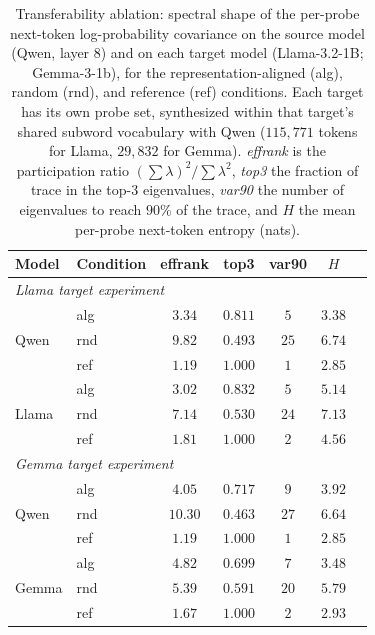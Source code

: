 \documentclass[11pt]{article}
\theoremstyle{definition}
\begin{document}
\begin{table}[t]
\centering
\small
\caption{Transferability ablation: spectral shape of the per-probe next-token
log-probability covariance on the source model (Qwen, layer 8) and on each
target model (Llama-3.2-1B; Gemma-3-1b), for the representation-aligned (alg),
random (rnd), and reference (ref) conditions. Each target has its own probe set,
synthesized within that target's shared subword vocabulary with Qwen ($115{,}771$
tokens for Llama, $29{,}832$ for Gemma). \emph{effrank} is the participation
ratio $(\sum\lambda)^2/\sum\lambda^2$, \emph{top3} the fraction of trace in the
top-3 eigenvalues, \emph{var90} the number of eigenvalues to reach $90\%$ of the
trace, and $H$ the mean per-probe next-token entropy (nats).}
\label{tab:ablate_conc}
\begin{tabular}{llccccc}
\toprule
Model & Condition & effrank & top3 & var90 & $H$ \\
\midrule
\multicolumn{6}{l}{\emph{Llama target experiment}}\\
\midrule
\multirow{3}{*}{Qwen}  & alg & $3.34$ & $0.811$ & $5$  & $3.38$ \\
                       & rnd & $9.82$ & $0.493$ & $25$ & $6.74$ \\
                       & ref & $1.19$ & $1.000$ & $1$  & $2.85$ \\
\midrule
\multirow{3}{*}{Llama} & alg & $3.02$ & $0.832$ & $5$  & $5.14$ \\
                       & rnd & $7.14$ & $0.530$ & $24$ & $7.13$ \\
                       & ref & $1.81$ & $1.000$ & $2$  & $4.56$ \\
\midrule
\multicolumn{6}{l}{\emph{Gemma target experiment}}\\
\midrule
\multirow{3}{*}{Qwen}  & alg & $4.05$ & $0.717$ & $9$  & $3.92$ \\
                       & rnd & $10.30$ & $0.463$ & $27$ & $6.64$ \\
                       & ref & $1.19$ & $1.000$ & $1$  & $2.85$ \\
\midrule
\multirow{3}{*}{Gemma} & alg & $4.82$ & $0.699$ & $7$  & $3.48$ \\
                       & rnd & $5.39$ & $0.591$ & $20$ & $5.79$ \\
                       & ref & $1.67$ & $1.000$ & $2$  & $2.93$ \\
\bottomrule
\end{tabular}
\end{table}
\end{document}
